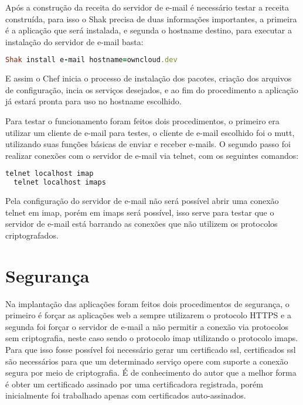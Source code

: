 Após a construção da receita do servidor de e-mail é necessário testar a receita construída,
para isso o Shak precisa de duas informações importantes, a primeira é a aplicação
que será instalada, e segunda o hostname destino, para executar a instalação
do servidor de e-mail basta:

\begin{lstlisting}[language=Ruby,label=dice_index,caption={Exemplo de execução de instalação do servidor de e-mailcom shak}]
Shak install e-mail hostname=owncloud.dev
\end{lstlisting}


E assim o Chef inicia o processo de instalação dos pacotes, criação dos arquivos
de configuração, incia os serviços desejados, e ao fim do procedimento a aplicação
já estará pronta para uso no hostname escolhido.

Para testar o funcionamento foram feitos dois procedimentos, o primeiro era utilizar
um cliente de e-mail para testes, o cliente de e-mail escolhido foi o mutt, utilizando
suas funções básicas de enviar e receber e-mails. O segundo passo foi realizar conexões
com o servidor de e-mail via telnet, com os seguintes comandos:

\begin{lstlisting}[language=Ruby,label=dice_index,caption={Exemplo de teste de conexão telnet no servidor imap}]
  telnet localhost imap
  telnet localhost imaps
\end{lstlisting}

Pela configuração do servidor de e-mail não será possível abrir uma conexão telnet
em imap, porém em imaps será possível, isso serve para testar que o servidor de e-mail
está barrando as conexões que não utilizem os protocolos criptografados.




\section{Segurança}
\label{sub:prototipo}

Na implantação das aplicações foram feitos dois procedimentos de segurança, o primeiro
é forçar as aplicações web a sempre utilizarem o protocolo HTTPS e a segunda foi forçar o
servidor de e-mail a não permitir a conexão via protocolos sem criptografia, neste
caso sendo o protocolo imap utilizando o protocolo imaps. Para que isso fosse possível
foi necessário gerar um certificado ssl, certificados ssl são necessários para
que um determinado serviço opere com suporte a conexão segura por meio de criptografia.
É de conhecimento do autor que a melhor forma é obter um certificado assinado
por uma certificadora registrada, porém inicialmente foi trabalhado apenas com certificados
auto-assinados.

